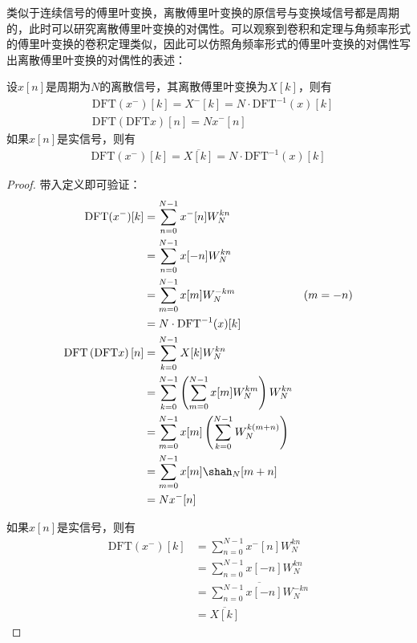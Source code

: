类似于连续信号的傅里叶变换，离散傅里叶变换的原信号与变换域信号都是周期的，此时可以研究离散傅里叶变换的对偶性。可以观察到卷积和定理与角频率形式的傅里叶变换的卷积定理类似，因此可以仿照角频率形式的傅里叶变换的对偶性写出离散傅里叶变换的对偶性的表述：
\begin{proposition}[离散傅里叶变换的对偶性]
    设$x[n]$是周期为$N$的离散信号，其离散傅里叶变换为$X[k]$，则有
    \begin{align*}
        &\mathrm{DFT}(x^-)[k]=X^-[k]=N\cdot\mathrm{DFT}^{-1}(x)[k]\\
        &\mathrm{DFT}\left(\mathrm{DFT}x\right)[n]=N x^- [n]
    \end{align*}
    如果$x[n]$是实信号，则有
    \begin{align*}
        \mathrm{DFT}(x^-)[k]=\overline{X[k]}=N\cdot\mathrm{DFT}^{-1}(x)[k]
    \end{align*}
\end{proposition}
\begin{proof}
    带入定义即可验证：
    \begin{align*}
        \mathrm{DFT}(x^-)[k]&=\sum_{n=0}^{N-1}x^- [n]W_N^{kn}\\
        &=\sum_{n=0}^{N-1}x[-n]W_N^{kn}\\
        &=\sum_{m=0}^{N-1}x[m]W_N^{-km}&(m=-n)\\
        &=N\cdot\mathrm{DFT}^{-1}(x)[k]\\
        \mathrm{DFT}\left(\mathrm{DFT}x\right)[n]&=\sum_{k=0}^{N-1}X[k]W_N^{kn}\\
        &=\sum_{k=0}^{N-1}\left(\sum_{m=0}^{N-1}x[m]W_N^{km}\right)W_N^{kn}\\
        &=\sum_{m=0}^{N-1}x[m]\left(\sum_{k=0}^{N-1}W_N^{k(m+n)}\right)\\
        &=\sum_{m=0}^{N-1}x[m]\shah_N[m+n]\\
        &=N x^- [n]
    \end{align*}

    如果$x[n]$是实信号，则有
    \begin{align*}
        \mathrm{DFT}(x^-)[k]&=\sum_{n=0}^{N-1}x^- [n]W_N^{kn}\\
        &=\sum_{n=0}^{N-1}x[-n]W_N^{kn}\\
        &=\overline{\sum_{n=0}^{N-1}x[-n]W_N^{-kn}}\\
        &=\overline{X[k]}
    \end{align*}
\end{proof}


